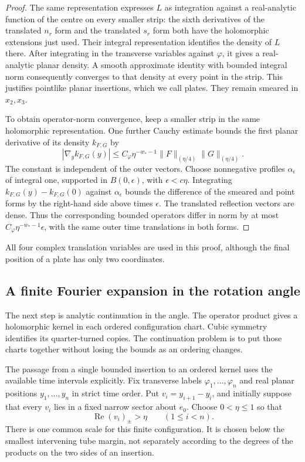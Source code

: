\documentclass[11pt,letterpaper,reqno]{amsart}
\theoremstyle{definition}
\theoremstyle{remark}
\begin{document}
\begin{proof}
The same representation expresses $L$ as integration against a
real-analytic function of the centre on every smaller strip: the
sixth derivatives of the translated $n_r$ form and the translated
$s_r$ form both have the holomorphic extensions just used. Their
integral representation identifies the density of $L$ there. After
integrating in the transverse variables against $\varphi$, it gives
a real-analytic planar density. A smooth approximate identity with
bounded integral norm consequently converges to that density at
every point in the strip. This justifies pointlike planar insertions,
which we call plates. They remain smeared in $x_2,x_3$.

To obtain operator-norm convergence, keep a smaller strip in the same
holomorphic representation. One further Cauchy estimate bounds the
first planar derivative of its density $k_{F,G}$ by
\[
 |\nabla_y k_{F,G}(y)|
 \le C_\varphi\eta^{-w_*-1}
                 \|F\|_{(\eta/4)}\|G\|_{(\eta/4)}.
\]
The constant is independent of the outer vectors. Choose nonnegative
profiles $\alpha_\epsilon$ of integral one, supported in
$B(0,\epsilon)$, with $\epsilon<c\eta$. Integrating
$k_{F,G}(y)-k_{F,G}(0)$ against $\alpha_\epsilon$ bounds the
difference of the smeared and point forms by the right-hand side
above times $\epsilon$. The translated reflection vectors are dense.
Thus the corresponding bounded operators differ in norm by at most
$C_\varphi\eta^{-w_*-1}\epsilon$, with the same outer time
translations in both forms.
\end{proof}

All four complex translation variables are used in this proof,
although the final position of a plate has only two coordinates.

\subsection{A finite Fourier expansion in the rotation angle}

The next step is analytic continuation in the angle. The operator
product gives a holomorphic kernel in each ordered configuration
chart. Cubic symmetry identifies its quarter-turned copies. The
continuation problem is to put those charts together without losing
the bounds as an ordering changes.

The passage from a single bounded insertion to an ordered kernel uses
the available time intervals explicitly. Fix transverse labels
$\varphi_1,\ldots,\varphi_n$ and real planar positions
$y_1,\ldots,y_n$ in strict time order. Put
$v_i=y_{i+1}-y_i$, and initially suppose that every $v_i$ lies in a
fixed narrow sector about $e_0$. Choose $0<\eta\le1$ so that
\[
 \operatorname{Re}(v_i)_\pm>\eta
 \qquad(1\le i<n).
\]
There is one common scale for this finite configuration. It is chosen
below the smallest intervening tube margin, not separately according
to the degrees of the products on the two sides of an insertion.
\end{document}
